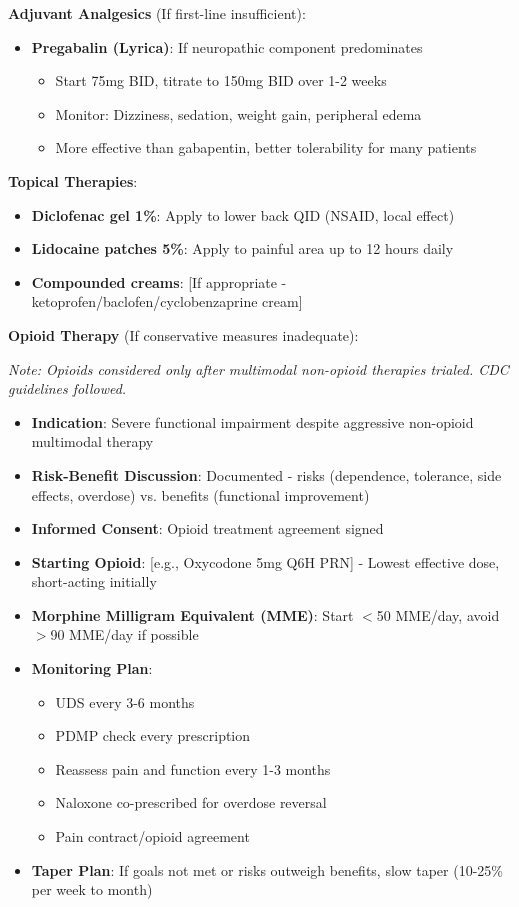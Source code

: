 \documentclass[11pt,letterpaper]{article}
\begin{document}
\textbf{Adjuvant Analgesics} (If first-line insufficient):

\begin{itemize}[leftmargin=*]
    \item \textbf{Pregabalin (Lyrica)}: If neuropathic component predominates
    \begin{itemize}
        \item Start 75mg BID, titrate to 150mg BID over 1-2 weeks
        \item Monitor: Dizziness, sedation, weight gain, peripheral edema
        \item More effective than gabapentin, better tolerability for many patients
    \end{itemize}
\end{itemize}

\textbf{Topical Therapies}:
\begin{itemize}[leftmargin=*]
    \item \textbf{Diclofenac gel 1\%}: Apply to lower back QID (NSAID, local effect)
    \item \textbf{Lidocaine patches 5\%}: Apply to painful area up to 12 hours daily
    \item \textbf{Compounded creams}: [If appropriate - ketoprofen/baclofen/cyclobenzaprine cream]
\end{itemize}

\textbf{Opioid Therapy} (If conservative measures inadequate):

\textit{Note: Opioids considered only after multimodal non-opioid therapies trialed. CDC guidelines followed.}

\begin{itemize}[leftmargin=*]
    \item \textbf{Indication}: Severe functional impairment despite aggressive non-opioid multimodal therapy
    \item \textbf{Risk-Benefit Discussion}: Documented - risks (dependence, tolerance, side effects, overdose) vs. benefits (functional improvement)
    \item \textbf{Informed Consent}: Opioid treatment agreement signed
    \item \textbf{Starting Opioid}: [e.g., Oxycodone 5mg Q6H PRN] - Lowest effective dose, short-acting initially
    \item \textbf{Morphine Milligram Equivalent (MME)}: Start $<$50 MME/day, avoid $>$90 MME/day if possible
    \item \textbf{Monitoring Plan}:
    \begin{itemize}
        \item UDS every 3-6 months
        \item PDMP check every prescription
        \item Reassess pain and function every 1-3 months
        \item Naloxone co-prescribed for overdose reversal
        \item Pain contract/opioid agreement
    \end{itemize}
    \item \textbf{Taper Plan}: If goals not met or risks outweigh benefits, slow taper (10-25\% per week to month)
\end{itemize}
\end{document}
